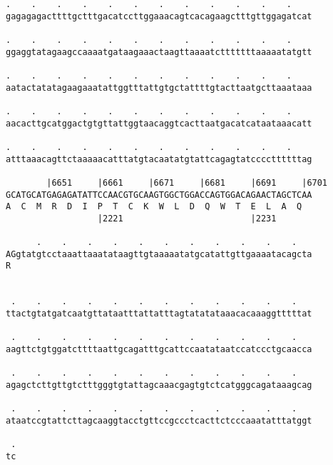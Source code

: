 \documentclass{article}
\begin{document}
\begin{Verbatim}
.    .    .    .    .    .    .    .    .    .    .    .    
gagagagacttttgctttgacatccttggaaacagtcacagaagctttgttggagatcat
                                                            
.    .    .    .    .    .    .    .    .    .    .    .    
ggaggtatagaagccaaaatgataagaaactaagttaaaatctttttttaaaaatatgtt
                                                            
.    .    .    .    .    .    .    .    .    .    .    .    
aatactatatagaagaaatattggtttattgtgctattttgtacttaatgcttaaataaa
                                                            
.    .    .    .    .    .    .    .    .    .    .    .    
aacacttgcatggactgtgttattggtaacaggtcacttaatgacatcataataaacatt
                                                            
.    .    .    .    .    .    .    .    .    .    .    .    
atttaaacagttctaaaaacatttatgtacaatatgtattcagagtatccccttttttag
                                                            
        |6651     |6661     |6671     |6681     |6691     |6701
GCATGCATGAGAGATATTCCAACGTGCAAGTGGCTGGACCAGTGGACAGAACTAGCTCAA
A  C  M  R  D  I  P  T  C  K  W  L  D  Q  W  T  E  L  A  Q  
                  |2221                         |2231       
  
      .    .    .    .    .    .    .    .    .    .    .   
AGgtatgtcctaaattaaatataagttgtaaaaatatgcatattgttgaaaatacagcta
R                                                           
                                                            
  
 .    .    .    .    .    .    .    .    .    .    .    .   
ttactgtatgatcaatgttataatttattatttagtatatataaacacaaaggtttttat
                                                            
 .    .    .    .    .    .    .    .    .    .    .    .   
aagttctgtggatcttttaattgcagatttgcattccaatataatccatccctgcaacca
                                                            
 .    .    .    .    .    .    .    .    .    .    .    .   
agagctcttgttgtctttgggtgtattagcaaacgagtgtctcatgggcagataaagcag
                                                            
 .    .    .    .    .    .    .    .    .    .    .    .   
ataatccgtattcttagcaaggtacctgttccgccctcacttctcccaaatatttatggt
                                                            
 .
tc
  

\end{Verbatim}
\end{document}
